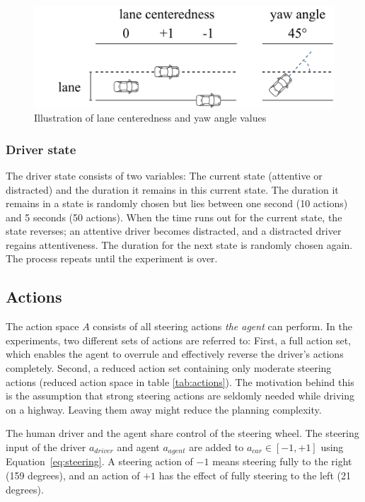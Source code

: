\begin{figure}[htbp]
    \includegraphics[width=0.6\linewidth]{figures/angle_distance.pdf}
    \centering
    \caption{Illustration of lane centeredness and yaw angle values}
    \label{fig:observations}
\end{figure}

\subsubsection*{Driver state}
\label{sec:driver_state}
The driver state consists of two variables: The current state (attentive or distracted) and the duration it remains in this current state. The duration it remains in a state is randomly chosen but lies between one second (10 actions) and 5 seconds (50 actions). When the time runs out for the current state, the state reverses; an attentive driver becomes distracted, and a distracted driver regains attentiveness. The duration for the next state is randomly chosen again. The process repeats until the experiment is over.

\subsection{Actions}
\label{sec:actions}


The action space $A$ consists of all steering actions \emph{the agent} can perform. In the experiments, two different sets of actions are referred to: First, a full action set, which enables the agent to overrule and effectively reverse the driver's actions completely. Second, a reduced action set containing only moderate steering actions (reduced action space in table \ref{tab:actions}). The motivation behind this is the assumption that strong steering actions are seldomly needed while driving on a highway. Leaving them away might reduce the planning complexity.

The human driver and the agent share control of the steering wheel. The steering input of the driver $a_{driver}$ and agent $a_{agent}$ are added to $a_{car} \in [-1, +1]$ using Equation~\ref{eq:steering}. A steering action of $-1$ means steering fully to the right (159 degrees), and an action of $+1$ has the effect of fully steering to the left (21 degrees). 

